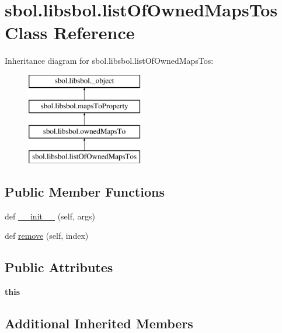 \hypertarget{classsbol_1_1libsbol_1_1list_of_owned_maps_tos}{}\section{sbol.\+libsbol.\+list\+Of\+Owned\+Maps\+Tos Class Reference}
\label{classsbol_1_1libsbol_1_1list_of_owned_maps_tos}
Inheritance diagram for sbol.\+libsbol.\+list\+Of\+Owned\+Maps\+Tos\+:\begin{figure}[H]
\begin{center}
\leavevmode
\includegraphics[height=4.000000cm]{classsbol_1_1libsbol_1_1list_of_owned_maps_tos}
\end{center}
\end{figure}
\subsection*{Public Member Functions}
\begin{DoxyCompactItemize}
\item 
def \hyperlink{classsbol_1_1libsbol_1_1list_of_owned_maps_tos_a50b6e2a8b7b51f1189e03cea6b4b94ff}{\+\_\+\+\_\+init\+\_\+\+\_\+} (self, args)
\item 
def \hyperlink{classsbol_1_1libsbol_1_1list_of_owned_maps_tos_a02b1f23496c8b32dbd70cd156b0f23e1}{remove} (self, index)
\end{DoxyCompactItemize}
\subsection*{Public Attributes}
\begin{DoxyCompactItemize}
\item 
{\bfseries this}\hypertarget{classsbol_1_1libsbol_1_1list_of_owned_maps_tos_a90d0c2fc442abb23a8094d14cd6c6ee9}{}\label{classsbol_1_1libsbol_1_1list_of_owned_maps_tos_a90d0c2fc442abb23a8094d14cd6c6ee9}

\end{DoxyCompactItemize}
\subsection*{Additional Inherited Members}


